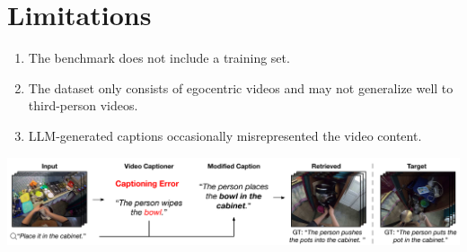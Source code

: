 \documentclass{article}
\begin{document}
\section*{Limitations}
\begin{enumerate}
    \item The benchmark does not include a training set.
    \item The dataset only consists of egocentric videos and may not generalize well to third-person videos.
    \item LLM-generated captions occasionally misrepresented the video content.
\end{enumerate}

\begin{center}
    \includegraphics[scale=0.22]{egocvr-3.png}
\end{center}
\end{document}
